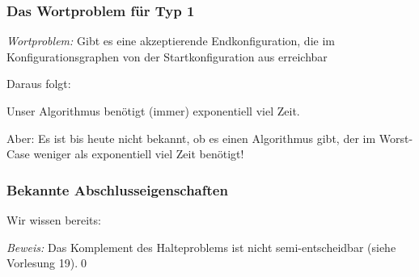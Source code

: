 \documentclass[onlymath]{beamer}
\begin{document}
\begin{frame}\frametitle{Das Wortproblem für Typ 1}

\emph{Wortproblem:} Gibt es eine akzeptierende
Endkonfiguration, die im Konfigurationsgraphen von der Startkonfiguration aus erreichbar 
\medskip\pause

Daraus folgt:\medskip


Unser Algorithmus benötigt (immer) exponentiell viel Zeit.
\medskip

\alert{Aber:} Es ist bis heute nicht bekannt, ob es einen Algorithmus gibt, der im Worst-Case weniger als exponentiell viel Zeit benötigt!
\bigskip\pause


\end{frame}


\begin{frame}\frametitle{Bekannte Abschlusseigenschaften}

Wir wissen bereits:\medskip

\medskip\pause

\medskip

\emph{Beweis:} Das Komplement des Halteproblems ist nicht semi-entscheidbar (siehe Vorlesung 19).\qed



\end{frame}
\end{document}
